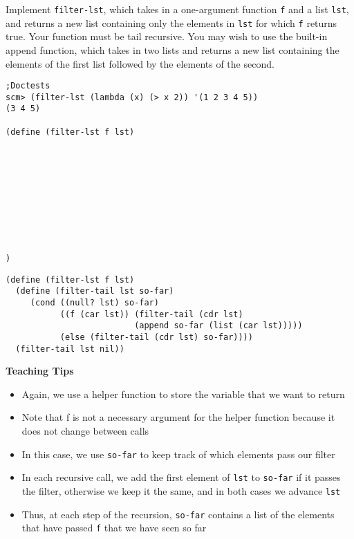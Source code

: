 \begin{blocksection}

\question Implement \texttt{filter-lst}, which takes in a one-argument function \texttt{f} and
a list \texttt{lst}, and returns a new list containing only the elements in \texttt{lst}
for which \texttt{f} returns true. Your function must be tail recursive.
\newline
You may wish to use the built-in append function, which takes in two lists and returns a
new list containing the elements of the first list followed by the elements of the second.

\begin{lstlisting}
;Doctests
scm> (filter-lst (lambda (x) (> x 2)) '(1 2 3 4 5))
(3 4 5)

(define (filter-lst f lst)










)
\end{lstlisting}

\begin{solution}[0.5in]
\begin{lstlisting}
(define (filter-lst f lst)
  (define (filter-tail lst so-far)
     (cond ((null? lst) so-far)
           ((f (car lst)) (filter-tail (cdr lst)
                          (append so-far (list (car lst)))))
           (else (filter-tail (cdr lst) so-far))))
  (filter-tail lst nil))
\end{lstlisting}
\end{solution}

\end{blocksection}

\begin{guide}
\begin{blocksection}
\textbf{Teaching Tips}
  \begin{itemize}
    \item Again, we use a helper function to store the variable that we want to return
    \item Note that f is not a necessary argument for the helper function because it does not change between calls
    \item In this case, we use \lstinline{so-far} to keep track of which elements pass our filter
    \item In each recursive call, we add the first element of \lstinline{lst} to \lstinline{so-far} if it passes the filter, otherwise we keep it the same, and in both cases we advance \lstinline{lst}
    \item Thus, at each step of the recursion, \lstinline{so-far} contains a list of the elements that have passed \lstinline{f} that we have seen so far
  \end{itemize}
\end{blocksection}
\end{guide}
